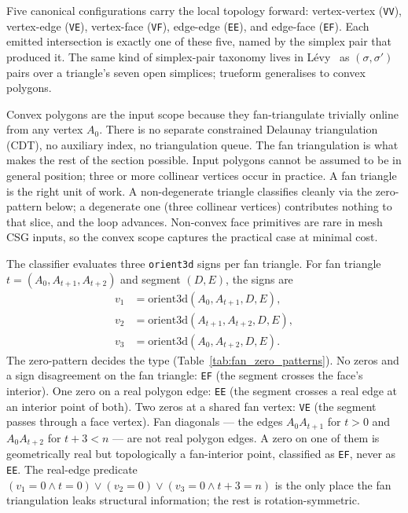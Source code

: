 \documentclass{egpubl}
\begin{document}
Five canonical configurations carry the local topology forward: vertex-vertex (\texttt{VV}), vertex-edge (\texttt{VE}), vertex-face (\texttt{VF}), edge-edge (\texttt{EE}), and edge-face (\texttt{EF}). Each emitted intersection is exactly one of these five, named by the simplex pair that produced it. The same kind of simplex-pair taxonomy lives in L\'evy~\cite{Levy2025} as $(\sigma, \sigma')$ pairs over a triangle's seven open simplices; trueform generalises to convex polygons.

Convex polygons are the input scope because they fan-triangulate trivially online from any vertex $A_0$. There is no separate constrained Delaunay triangulation (CDT), no auxiliary index, no triangulation queue. The fan triangulation is what makes the rest of the section possible. Input polygons cannot be assumed to be in general position; three or more collinear vertices occur in practice. A fan triangle is the right unit of work. A non-degenerate triangle classifies cleanly via the zero-pattern below; a degenerate one (three collinear vertices) contributes nothing to that slice, and the loop advances. Non-convex face primitives are rare in mesh CSG inputs, so the convex scope captures the practical case at minimal cost.

The classifier evaluates three \texttt{orient3d} signs per fan triangle. For fan triangle $t = (A_0, A_{t+1}, A_{t+2})$ and segment $(D, E)$, the signs are
\[
\begin{aligned}
v_1 &= \mathrm{orient3d}(A_0,     A_{t+1}, D, E),\\
v_2 &= \mathrm{orient3d}(A_{t+1}, A_{t+2}, D, E),\\
v_3 &= \mathrm{orient3d}(A_0,     A_{t+2}, D, E).
\end{aligned}
\]
The zero-pattern decides the type (Table~\ref{tab:fan_zero_patterns}). No zeros and a sign disagreement on the fan triangle: \texttt{EF} (the segment crosses the face's interior). One zero on a real polygon edge: \texttt{EE} (the segment crosses a real edge at an interior point of both). Two zeros at a shared fan vertex: \texttt{VE} (the segment passes through a face vertex). Fan diagonals --- the edges $A_0 A_{t+1}$ for $t > 0$ and $A_0 A_{t+2}$ for $t + 3 < n$ --- are not real polygon edges. A zero on one of them is geometrically real but topologically a fan-interior point, classified as \texttt{EF}, never as \texttt{EE}. The real-edge predicate $(v_1 = 0 \land t = 0) \lor (v_2 = 0) \lor (v_3 = 0 \land t + 3 = n)$ is the only place the fan triangulation leaks structural information; the rest is rotation-symmetric.
\end{document}
